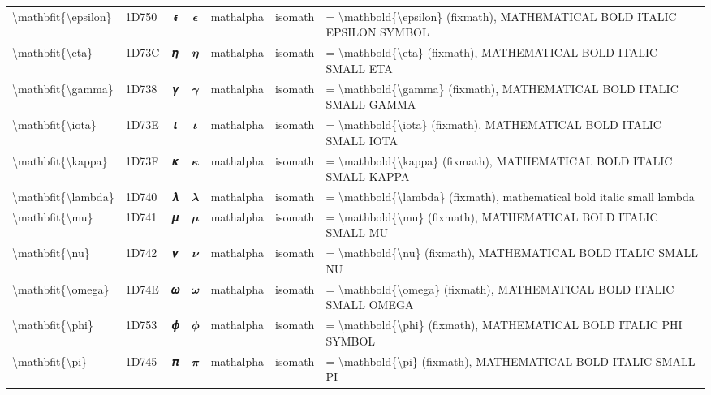 \documentclass[a4paper,landscape]{article}
\begin{document}
\begin{longtable}{llcclll}
\textbackslash{}mathbfit\{\textbackslash{}epsilon\} & 1D750 & 𝝐 & $\mathbfit{\epsilon}$ & mathalpha & isomath & = \textbackslash{}mathbold\{\textbackslash{}epsilon\} (fixmath), MATHEMATICAL BOLD ITALIC EPSILON SYMBOL \\
\textbackslash{}mathbfit\{\textbackslash{}eta\} & 1D73C & 𝜼 & $\mathbfit{\eta}$ & mathalpha & isomath & = \textbackslash{}mathbold\{\textbackslash{}eta\} (fixmath), MATHEMATICAL BOLD ITALIC SMALL ETA \\
\textbackslash{}mathbfit\{\textbackslash{}gamma\} & 1D738 & 𝜸 & $\mathbfit{\gamma}$ & mathalpha & isomath & = \textbackslash{}mathbold\{\textbackslash{}gamma\} (fixmath), MATHEMATICAL BOLD ITALIC SMALL GAMMA \\
\textbackslash{}mathbfit\{\textbackslash{}iota\} & 1D73E & 𝜾 & $\mathbfit{\iota}$ & mathalpha & isomath & = \textbackslash{}mathbold\{\textbackslash{}iota\} (fixmath), MATHEMATICAL BOLD ITALIC SMALL IOTA \\
\textbackslash{}mathbfit\{\textbackslash{}kappa\} & 1D73F & 𝜿 & $\mathbfit{\kappa}$ & mathalpha & isomath & = \textbackslash{}mathbold\{\textbackslash{}kappa\} (fixmath), MATHEMATICAL BOLD ITALIC SMALL KAPPA \\
\textbackslash{}mathbfit\{\textbackslash{}lambda\} & 1D740 & 𝝀 & $\mathbfit{\lambda}$ & mathalpha & isomath & = \textbackslash{}mathbold\{\textbackslash{}lambda\} (fixmath), mathematical bold italic small lambda \\
\textbackslash{}mathbfit\{\textbackslash{}mu\} & 1D741 & 𝝁 & $\mathbfit{\mu}$ & mathalpha & isomath & = \textbackslash{}mathbold\{\textbackslash{}mu\} (fixmath), MATHEMATICAL BOLD ITALIC SMALL MU \\
\textbackslash{}mathbfit\{\textbackslash{}nu\} & 1D742 & 𝝂 & $\mathbfit{\nu}$ & mathalpha & isomath & = \textbackslash{}mathbold\{\textbackslash{}nu\} (fixmath), MATHEMATICAL BOLD ITALIC SMALL NU \\
\textbackslash{}mathbfit\{\textbackslash{}omega\} & 1D74E & 𝝎 & $\mathbfit{\omega}$ & mathalpha & isomath & = \textbackslash{}mathbold\{\textbackslash{}omega\} (fixmath), MATHEMATICAL BOLD ITALIC SMALL OMEGA \\
\textbackslash{}mathbfit\{\textbackslash{}phi\} & 1D753 & 𝝓 & $\mathbfit{\phi}$ & mathalpha & isomath & = \textbackslash{}mathbold\{\textbackslash{}phi\} (fixmath), MATHEMATICAL BOLD ITALIC PHI SYMBOL \\
\textbackslash{}mathbfit\{\textbackslash{}pi\} & 1D745 & 𝝅 & $\mathbfit{\pi}$ & mathalpha & isomath & = \textbackslash{}mathbold\{\textbackslash{}pi\} (fixmath), MATHEMATICAL BOLD ITALIC SMALL PI \\

\end{longtable}
\end{document}
